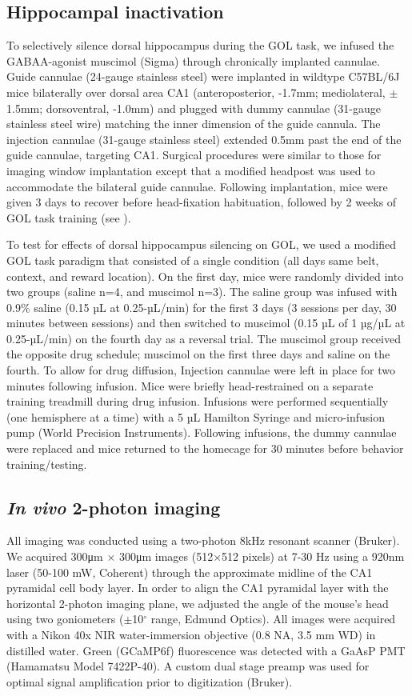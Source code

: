 \subsection{Hippocampal inactivation}
To selectively silence dorsal hippocampus during the GOL task, we infused the GABAA-agonist muscimol (Sigma) through chronically implanted cannulae. Guide cannulae (24-gauge stainless steel) were implanted in wildtype C57BL/6J mice bilaterally over dorsal area CA1 (anteroposterior, -1.7mm; mediolateral, $\pm$1.5mm; dorsoventral, -1.0mm) and plugged with dummy cannulae (31-gauge stainless steel wire) matching the inner dimension of the guide cannula. The injection cannulae (31-gauge stainless steel) extended 0.5mm past the end of the guide cannulae, targeting CA1. Surgical procedures were similar to those for imaging window implantation except that a modified headpost was used to accommodate the bilateral guide cannulae. Following implantation, mice were given 3 days to recover before head-fixation habituation, followed by 2 weeks of GOL task training (see ).

To test for effects of dorsal hippocampus silencing on GOL, we used a modified GOL task paradigm that consisted of a single condition (all days same belt, context, and reward location). On the first day, mice were randomly divided into two groups (saline n=4, and muscimol n=3). The saline group was infused with 0.9$\%$ saline (0.15 µL at 0.25-µL/min) for the first 3 days (3 sessions per day, 30 minutes between sessions) and then switched to muscimol (0.15 µL of 1 µg/µL at 0.25-µL/min) on the fourth day as a reversal trial. The muscimol group received the opposite drug schedule; muscimol on the first three days and saline on the fourth. To allow for drug diffusion, Injection cannulae were left in place for two minutes following infusion. Mice were briefly head-restrained on a separate training treadmill during drug infusion. Infusions were performed sequentially (one hemisphere at a time) with a 5 µL Hamilton Syringe and micro-infusion pump (World Precision Instruments). Following infusions, the dummy cannulae were replaced and mice returned to the homecage for 30 minutes before behavior training/testing.

\subsection{\emph{In vivo} 2-photon imaging}
All imaging was conducted using a two-photon 8kHz resonant scanner (Bruker). We acquired 300μm $\times$ 300μm images (512$\times$512 pixels) at 7-30 Hz using a 920nm laser (50-100 mW, Coherent) through the approximate midline of the CA1 pyramidal cell body layer.  In order to align the CA1 pyramidal layer with the horizontal 2-photon imaging plane, we adjusted the angle of the mouse’s head using two goniometers ($\pm$10$^{\circ}$ range, Edmund Optics).  All images were acquired with a Nikon 40x NIR water-immersion objective (0.8 NA, 3.5 mm WD) in distilled water. Green (GCaMP6f) fluorescence was detected with a GaAsP PMT (Hamamatsu Model 7422P-40). A custom dual stage preamp was used for optimal signal amplification prior to digitization (Bruker). 

